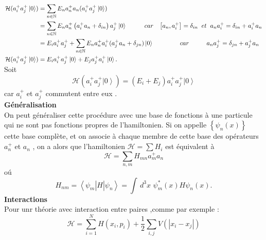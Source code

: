 \documentclass[12pt,a4paper, openany]{article}
\begin{document}
$\left.\begin{aligned}
	\mathcal{H}(a_i^{+}a_j ^{+}\left|0\right\rangle)&=\sum_{n\in\mathbb{N}}E_na^{+}_na_n(a_i^{+}a_j ^{+}\left|0\right\rangle) \\
	&=\sum_{n\in\mathbb{N}}E_na^{+}_n\left(a_i^{+}a_n+\delta_{in}\right)a^{+}_j\left|0\right\rangle \hspace{1cm}  car\hspace{0.3cm}\left[a_n,a_i^{+}\right]=\delta_{in}\hspace{0.2cm} et\hspace{0.2cm} a_na_i^{+}= \delta_{in}+a_i^{+}a_n \\
	&=E_ia_i^{+}a_j ^{+}+\sum_{n\in\mathbb{N}}E_na^{+}_na^{+}_i(a_j^{+}a_n+\delta_{jn})\left|0\right\rangle \hspace{1.5cm} car\hspace{1cm} a_na_j^{+}= \delta_{jn}+a_j^{+}a_n \\
	\mathcal{H}(a_i^{+}a_j ^{+}\left|0\right\rangle)&=E_ia_i^{+}a_j ^{+}\left|0\right\rangle+E_ja_j^{+}a_i^{+}\left|0\right\rangle .
\end{aligned}\right.$
Soit 
\begin{equation}
	\mathcal{H}(a_i^{+}a_j ^{+}\left|0\right\rangle)=(E_i+E_j)a_i^{+}a_j ^{+}\left|0\right\rangle
\end{equation}
car $a^{+}_i$ et $a^{+}_j$ commutent entre eux . \\

\textbf{Généralisation}\\

\hspace{0.5cm}On peut généraliser cette procédure avec une base de fonctions à une particule qui ne sont pas fonctions propres de l’hamiltonien. Si on appelle $\left\{\psi_n(x)\right\} $ cette base complète, et on associe à chaque membre de cette base des opérateurs $a^{+}_n$ et $a_n$ , on a alors que l’hamiltonien $\mathcal{H}=\sum{H_i}$ est équivalent à 
\begin{equation}
	\mathcal{H}=\sum_{n,m}H_{mn}a^{+}_{m}a_n
\end{equation}
o\'{u} 
\begin{equation}
	H_{nm}=\left\langle {\psi}_m \right|H\left|{\psi}_n\right\rangle =\int\,d^{3}x\,\,{\psi}^{*}_m(x)H{\psi}_n(x) .
\end{equation}
\textbf{Interactions}\\

\hspace{0.5cm}Pour unr théorie avec interaction entre paires ,comme par exemple :
\begin{equation}
	\mathcal{H}=\sum_{i=1}^{N}H(x_i,p_i)+\frac{1}{2}\sum_{i,j}V(\left|x_i-x_j\right|)
\end{equation}
\end{document}
